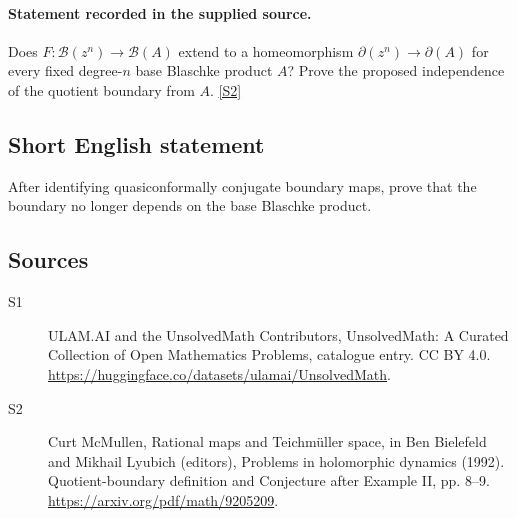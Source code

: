 \documentclass[11pt]{article}
\newcommand{\sref}[2]{\hyperlink{source:#1:#2}{[S#2]}}
\begin{document}
\paragraph{Statement recorded in the supplied source.}
Does $F:\mathcal B(z^n)\to\mathcal B(A)$ extend to a homeomorphism $\partial(z^n)\to\partial(A)$ for every fixed degree-$n$ base Blaschke product $A$? Prove the proposed independence of the quotient boundary from $A$. \sref{statement}{2}
\subsection{Short English statement}
After identifying quasiconformally conjugate boundary maps, prove that the boundary no longer depends on the base Blaschke product.
\subsection{Sources}
\begin{description}
\item[\hypertarget{source:statement:1}{S1}] ULAM.AI and the UnsolvedMath Contributors, UnsolvedMath: A Curated Collection of Open Mathematics Problems, catalogue entry. CC BY 4.0. \url{https://huggingface.co/datasets/ulamai/UnsolvedMath}.
\item[\hypertarget{source:statement:2}{S2}] Curt McMullen, Rational maps and Teichmüller space, in Ben Bielefeld and Mikhail Lyubich (editors), Problems in holomorphic dynamics (1992). Quotient-boundary definition and Conjecture after Example II, pp. 8–9. \url{https://arxiv.org/pdf/math/9205209}.
\end{description}
\label{end:statement}
\end{document}
